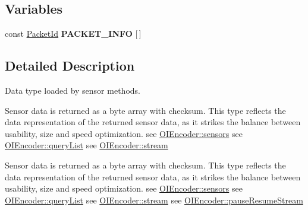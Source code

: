 \subsection*{Variables}
\begin{DoxyCompactItemize}
\item 
\hypertarget{namespaceroomba_1_1series500_1_1oi_1_1sensors_a4869957d0a94bd8548056c4ebd8effb6}{const \hyperlink{namespaceroomba_1_1series500_1_1oi_1_1sensors_a909f47d40452d1cabb85eef642ac04b6}{Packet\+Id} {\bfseries P\+A\+C\+K\+E\+T\+\_\+\+I\+N\+F\+O} \mbox{[}$\,$\mbox{]}}\label{namespaceroomba_1_1series500_1_1oi_1_1sensors_a4869957d0a94bd8548056c4ebd8effb6}

\end{DoxyCompactItemize}


\subsection{Detailed Description}
Data type loaded by sensor methods. 

Sensor data is returned as a byte array with checksum. This type reflects the data representation of the returned sensor data, as it strikes the balance between usability, size and speed optimization. see \hyperlink{classroomba_1_1series500_1_1oi_1_1_o_i_encoder_a5b7751abfbb6a07a0c62b7a1646e3703}{O\+I\+Encoder\+::sensors} see \hyperlink{classroomba_1_1series500_1_1oi_1_1_o_i_encoder_a576852ce7ce8da29fd1e1088abc8c466}{O\+I\+Encoder\+::query\+List} see \hyperlink{classroomba_1_1series500_1_1oi_1_1_o_i_encoder_af0a440e4ed8b689a2ba9a8554f951e91}{O\+I\+Encoder\+::stream}

Sensor data is returned as a byte array with checksum. This type reflects the data representation of the returned sensor data, as it strikes the balance between usability, size and speed optimization. see \hyperlink{classroomba_1_1series500_1_1oi_1_1_o_i_encoder_a5b7751abfbb6a07a0c62b7a1646e3703}{O\+I\+Encoder\+::sensors} see \hyperlink{classroomba_1_1series500_1_1oi_1_1_o_i_encoder_a576852ce7ce8da29fd1e1088abc8c466}{O\+I\+Encoder\+::query\+List} see \hyperlink{classroomba_1_1series500_1_1oi_1_1_o_i_encoder_af0a440e4ed8b689a2ba9a8554f951e91}{O\+I\+Encoder\+::stream} see \hyperlink{classroomba_1_1series500_1_1oi_1_1_o_i_encoder_a7fa2db1885854427094d67cae5b29837}{O\+I\+Encoder\+::pause\+Resume\+Stream} 

